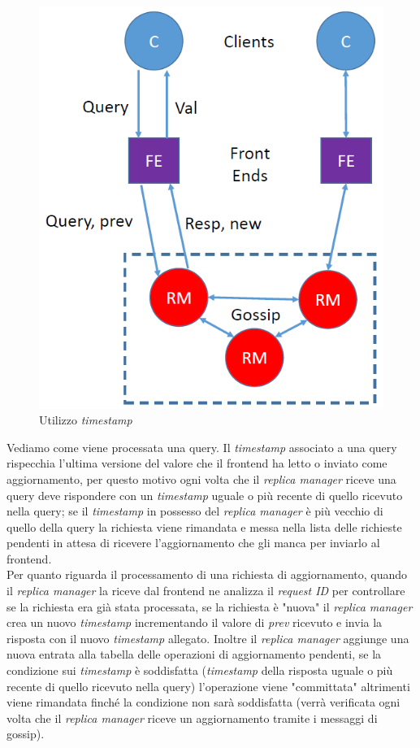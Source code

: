 \documentclass{article}
\begin{document}
\begin{figure}[H]
\centering
\includegraphics[scale=0.5]{img/Timestamp.PNG}
\caption{Utilizzo \textit{timestamp}}
\end{figure}

Vediamo come viene processata una query. Il \textit{timestamp} associato a una query rispecchia l'ultima versione del valore che il frontend ha letto o inviato come aggiornamento, per questo motivo ogni volta che il \textit{replica manager} riceve una query deve rispondere con un \textit{timestamp} uguale o più recente di quello ricevuto nella query; se il \textit{timestamp} in possesso del \textit{replica manager} è più vecchio di quello della query la richiesta viene rimandata e messa nella lista delle richieste pendenti in attesa di ricevere l'aggiornamento che gli manca per inviarlo al frontend. \\ 
Per quanto riguarda il processamento di una richiesta di aggiornamento, quando il \textit{replica manager} la riceve dal frontend ne analizza il \textit{request ID} per controllare se la richiesta era già stata processata, se la richiesta è "nuova" il \textit{replica manager} crea un nuovo \textit{timestamp} incrementando il valore di \textit{prev} ricevuto e invia la risposta con il nuovo \textit{timestamp} allegato. Inoltre il \textit{replica manager} aggiunge una nuova entrata alla tabella delle operazioni di aggiornamento pendenti, se la condizione sui \textit{timestamp} è soddisfatta (\textit{timestamp} della risposta uguale o più recente di quello ricevuto nella query) l'operazione viene "committata" altrimenti viene rimandata finché la condizione non sarà soddisfatta (verrà verificata ogni volta che il \textit{replica manager} riceve un aggiornamento tramite i messaggi di gossip).
\end{document}
